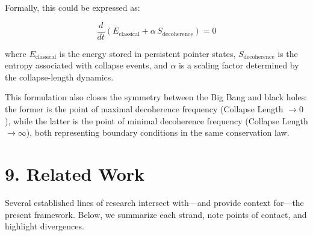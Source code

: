 \documentclass[
]{article}
\begin{document}
Formally, this could be expressed as:

\[
\frac{d}{dt}\!\left(E_{\text{classical}} + \alpha\, S_{\text{decoherence}}\right)=0
\]

where \(E_{\text{classical}}\) is the energy stored in persistent
pointer states, \(S_{\text{decoherence}}\) is the entropy associated
with collapse events, and \(\alpha\) is a scaling factor determined by
the collapse-length dynamics.

This formulation also closes the symmetry between the Big Bang and black
holes: the former is the point of maximal decoherence frequency
(Collapse Length \(\to 0\)), while the latter is the point of minimal
decoherence frequency (Collapse Length \(\to \infty\)), both
representing boundary conditions in the same conservation law.

\section{9. Related Work}\label{related-work}

Several established lines of research intersect with---and provide
context for---the present framework. Below, we summarize each strand,
note points of contact, and highlight divergences.
\end{document}
